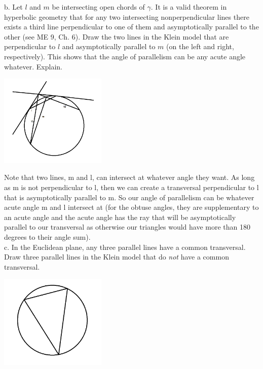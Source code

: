 \documentclass[12pt,letterpaper]{article}
\begin{document}
b. Let $l$ and $m$ be intersecting open chords of $\gamma$. It is a valid theorem in hyperbolic geometry that for any two intersecting nonperpendicular lines there exists a third line perpendicular to one of them and asymptotically parallel to the other (see ME 9, Ch. 6). Draw the two lines in the Klein model that are perpendicular to $l$ and asymptotically parallel to $m$ (on the left and right, respectively). This shows that the angle of parallelism can be any acute angle whatever. Explain. \\


\begin{center}
\includegraphics[width=2in]{klein2b.png}
\end{center}

Note that two lines, m and l, can intersect at whatever angle they want.  As long as m is not perpendicular to l, then we can create a transversal perpendicular to l that is asymptotically parallel to m.  So our angle of parallelism can be whatever acute angle m and l intersect at (for the obtuse angles, they are supplementary to an acute angle and the acute angle has the ray that will be asymptotically parallel to our transversal as otherwise our triangles would have more than 180 degrees to their angle sum).\\


\newpage 
c. In the Euclidean plane, any three parallel lines have a common transversal. Draw three parallel lines in the Klein model that do \emph{not} have a common transversal.\\

\begin{center}
\includegraphics[width=2in]{Threepar.png}
\end{center}
\end{document}
